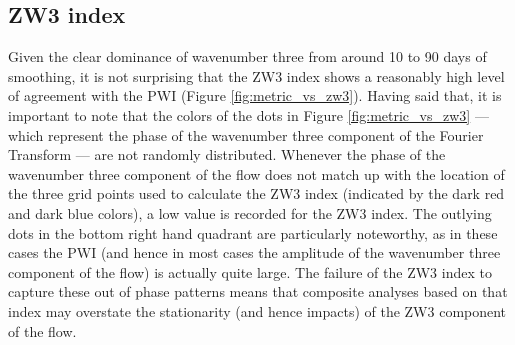 \subsection{ZW3 index}

Given the clear dominance of wavenumber three from around 10 to 90 days of smoothing, it is not surprising that the ZW3 index \citep{Raphael2004} shows a reasonably high level of agreement with the PWI (Figure \ref{fig:metric_vs_zw3}). Having said that, it is important to note that the colors of the dots in Figure \ref{fig:metric_vs_zw3} --- which represent the phase of the wavenumber three component of the Fourier Transform --- are not randomly distributed. Whenever the phase of the wavenumber three component of the flow does not match up with the location of the three grid points used to calculate the ZW3 index (indicated by the dark red and dark blue colors), a low value is recorded for the ZW3 index. The outlying dots in the bottom right hand quadrant are particularly noteworthy, as in these cases the PWI (and hence in most cases the amplitude of the wavenumber three component of the flow) is actually quite large. The failure of the ZW3 index to capture these out of phase patterns means that composite analyses based on that index may overstate the stationarity (and hence impacts) of the ZW3 component of the flow.